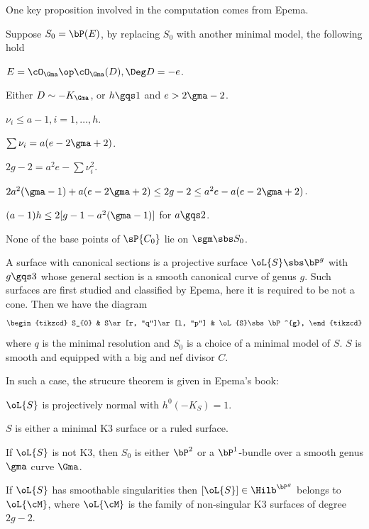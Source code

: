 \documentclass[a4paper, twoside]{article}
\begin{document}
One key proposition involved in the computation comes from Epema\cite{Epema1984}.

\begin{prp}[Proposition~9.3]
	Suppose $S_{0}=\bP(E)$, by replacing $S_{0}$ with another minimal model, the following hold
	\begin{enr}
		\item $E=\cO_{\Gma}\op\cO_{\Gma}(D), \Deg D=-e$.
		\item Either $D\sim-K_{\Gma}$, or $h\gqs1$ and $e>2\gma-2$.
		\item $\nu_{i}\leq a-1, i=1,\ldots,h$.
		\item $\sum\nu_{i}=a(e-2\gma+2)$.
		\item $2g-2=a^{2}e-\sum\nu_{i}^{2}$.
		\item $2a^{2}(\gma-1)+a(e-2\gma+2)\leq2g-2\leq a^{2}e-a(e-2\gma+2)$.
		\item $(a-1)h\leq2[g-1-a^{2}(\gma-1)]$ for $a\gqs2$.
		\item None of the base points of $\sP{C_{0}}$ lie on $\sgm\sbs S_{0}$.
	\end{enr}
\end{prp}


\begin{stp}
	A surface with canonical sections is a projective surface $\oL{S}\sbs\bP^{g}$ with $g\gqs3$ whose general section is a smooth canonical curve of genus $g$. Such surfaces are first studied and classified by Epema, here it is required to be not a cone. Then we have the diagram
	\[
		\begin{tikzcd}
			S_{0} & S\ar[r, "q"]\ar[l, "p"] & \oL{S}\sbs\bP^{g},
		\end{tikzcd}
	\]
	where $q$ is the minimal resolution and $S_{0}$ is a choice of a minimal model of $S$. $S$ is smooth and equipped with a big and nef divisor $C$.
\end{stp}

In such a case, the strucure theorem is given in Epema's book\cite{Epema1984}:
\begin{prp}
	\begin{enr}
		\item $\oL{S}$ is projectively normal with $h^{0}(-K_{S})=1$.
		\item $S$ is either a minimal K3 surface or a ruled surface.
		\item If $\oL{S}$ is not K3, then $S_{0}$ is either $\bP^{2}$ or a $\bP^{1}$-bundle over a smooth genus $\gma$ curve $\Gma$.
	\end{enr}
\end{prp}


\begin{thm}[Theorem~10.3]
	If $\oL{S}$ has smoothable singularities then $[\oL{S}]\in\Hilb^{\bP^{g}}$ belongs to $\oL{\cM}$, where $\oL{\cM}$ is the family of non-singular K3 surfaces of degree $2g-2$.
\end{thm}





\end{document}
